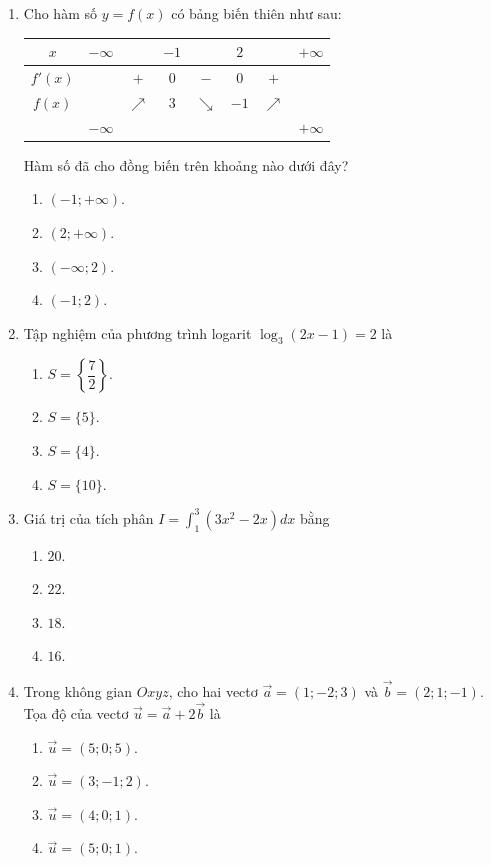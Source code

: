 \documentclass[12pt,a4paper]{article}
\begin{document}
\begin{enumerate}[label=\textbf{Câu \arabic*:}, leftmargin=*]

\item Cho hàm số $y = f(x)$ có bảng biến thiên như sau:
\begin{center}
\begin{tabular}{|c|ccccccc|}
\hline
$x$ & $-\infty$ & & $-1$ & & $2$ & & $+\infty$ \\ \hline
$f'(x)$ & & $+$ & $0$ & $-$ & $0$ & $+$ & \\ \hline
$f(x)$ & & $\nearrow$ & $3$ & $\searrow$ & $-1$ & $\nearrow$ & \\ 
 & $-\infty$ & & & & & & $+\infty$ \\ \hline
\end{tabular}
\end{center}
Hàm số đã cho đồng biến trên khoảng nào dưới đây?
\begin{enumerate}[label=\Alph*.]
    \item $(-1; +\infty)$.
    \item $(2; +\infty)$.
    \item $(-\infty; 2)$.
    \item $(-1; 2)$.
\end{enumerate}

\item Tập nghiệm của phương trình logarit $\log_3(2x - 1) = 2$ là
\begin{enumerate}[label=\Alph*.]
    \item $S = \left\{\dfrac{7}{2}\right\}$.
    \item $S = \{5\}$.
    \item $S = \{4\}$.
    \item $S = \{10\}$.
\end{enumerate}

\item Giá trị của tích phân $I = \int_1^3 (3x^2 - 2x) dx$ bằng
\begin{enumerate}[label=\Alph*.]
    \item $20$.
    \item $22$.
    \item $18$.
    \item $16$.
\end{enumerate}

\item Trong không gian $Oxyz$, cho hai vectơ $\vec{a} = (1; -2; 3)$ và $\vec{b} = (2; 1; -1)$. Tọa độ của vectơ $\vec{u} = \vec{a} + 2\vec{b}$ là
\begin{enumerate}[label=\Alph*.]
    \item $\vec{u} = (5; 0; 5)$.
    \item $\vec{u} = (3; -1; 2)$.
    \item $\vec{u} = (4; 0; 1)$.
    \item $\vec{u} = (5; 0; 1)$.
\end{enumerate}


\end{enumerate}
\end{document}
